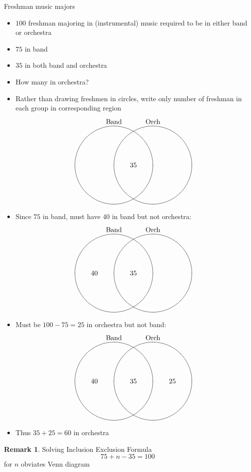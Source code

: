 \documentclass{beamer}
\theoremstyle{definition}
\newtheorem{remark}{Remark}
\begin{document}
\begin{frame}{Freshman music majors}
\begin{itemize}
\item $100$ freshman majoring in (instrumental) music
required to be in either band or orchestra
\item $75$ in band
\item $35$ in both band and orchestra
\item How many in orchestra?
\item Rather than drawing freshmen in circles,
write only \alert{number} of freshman in each
group in corresponding region 
\[\begin{xy}<1cm,0cm>:
(-1,2)*+!D{\text{Band}};
(1,2)*+!D{\text{Orch}};
(-1,0)*\cir<2cm>{};
(1,0)*\cir<2cm>{};
(0,0)*{35};
\end{xy}\]
\end{itemize}
\end{frame}

\begin{frame}
\begin{itemize}
\item Since $75$ in band, must have
$40$ in band but not orchestra:
\[\begin{xy}<1cm,0cm>:
(-1,2)*+!D{\text{Band}};
(1,2)*+!D{\text{Orch}};
(-1,0)*\cir<2cm>{};
(1,0)*\cir<2cm>{};
(0,0)*{35};
(-2,0)*{40};
\end{xy}\]
\end{itemize}
\end{frame}

\begin{frame}
\begin{itemize}
\item Must be $100-75=25$ in orchestra but not band:
\[\begin{xy}<1cm,0cm>:
(-1,2)*+!D{\text{Band}};
(1,2)*+!D{\text{Orch}};
(-1,0)*\cir<2cm>{};
(1,0)*\cir<2cm>{};
(0,0)*{35};
(-2,0)*{40};
(2,0)*{25};
\end{xy}\]
\item Thus $35+25=60$ in orchestra
\end{itemize}
\begin{remark}
Solving Inclusion Exclusion Formula
\[75+n-35=100\]
for $n$ obviates Venn diagram
\end{remark}
\end{frame}
\end{document}
